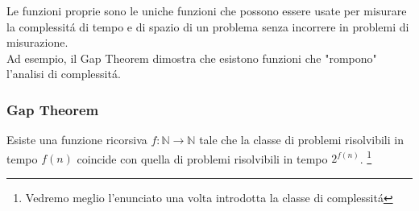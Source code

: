 Le funzioni proprie sono le uniche funzioni che possono essere usate per misurare la complessitá di tempo e di spazio di un problema senza incorrere in problemi di misurazione.\\ 
Ad esempio, il Gap Theorem dimostra che esistono funzioni che "rompono" l'analisi di complessitá.

\subsubsection*{Gap Theorem}
Esiste una funzione ricorsiva $f: \mathbb{N} \rightarrow \mathbb{N}$ tale che la classe di problemi risolvibili in tempo $f(n)$ coincide con quella di problemi risolvibili in tempo $2^{f(n)}$. \footnote{Vedremo meglio l'enunciato una volta introdotta la classe di complessitá \TIME{}}
